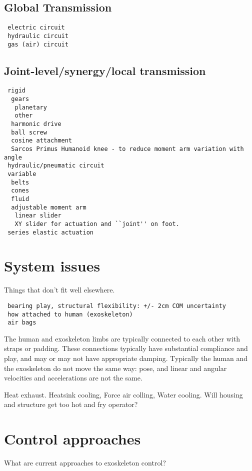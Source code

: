 \documentclass[letterpaper,12pt,fullpage]{article}
\begin{document}
\subsection{Global Transmission}

\begin{verbatim}
 electric circuit
 hydraulic circuit
 gas (air) circuit
\end{verbatim}

\subsection{Joint-level/synergy/local transmission}

\begin{verbatim}
 rigid
  gears
   planetary
   other
  harmonic drive
  ball screw
  cosine attachment
  Sarcos Primus Humanoid knee - to reduce moment arm variation with angle
 hydraulic/pneumatic circuit
 variable
  belts
  cones
  fluid
  adjustable moment arm
   linear slider
   XY slider for actuation and ``joint'' on foot.
 series elastic actuation
\end{verbatim}

\section{System issues}

Things that don't fit well elsewhere.

\begin{verbatim}
 bearing play, structural flexibility: +/- 2cm COM uncertainty
 how attached to human (exoskeleton)
 air bags
\end{verbatim}

The human and exoskeleton limbs are typically connected to each
other with straps or padding. These connections typically have substantial
compliance and play, and may or may not have appropriate damping.
Typically the human and the exoskeleton do not move the same way:
pose, and linear and angular velocities and accelerations are not the same.

Heat exhaust. Heatsink cooling, Force air colling, Water cooling.
Will housing and structure get too hot and fry operator?

\section{Control approaches}

What are current approaches to exoskeleton control?
\end{document}
